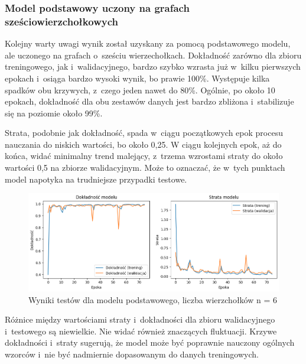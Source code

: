 \subsubsection{Model podstawowy uczony na grafach sześciowierzchołkowych}

Kolejny warty uwagi wynik został uzyskany za pomocą podstawowego modelu, ale uczonego na grafach o~sześciu wierzechołkach.
Dokładność zarówno dla zbioru treningowego, jak i~walidacyjnego, bardzo szybko wzrasta już w~kilku pierwszych epokach
i~osiąga bardzo wysoki wynik, bo prawie 100\%.
Występuje kilka spadków obu krzywych, z~czego jeden nawet do 80\%.
Ogólnie, po około 10 epokach, dokładność dla obu zestawów danych jest bardzo zbliżona i~stabilizuje się na poziomie około 99\%.

Strata, podobnie jak dokładność, spada w~ciągu początkowych epok procesu nauczania do niskich wartości, bo około 0,25.
W ciągu kolejnych epok, aż do końca, widać minimalny trend malejący, z~trzema wzrostami straty do około wartości 0,5 na zbiorze walidacyjnym.
Może to oznaczać, że w~tych punktach model napotyka na trudniejsze przypadki testowe.

\begin{figure}[ht]
	\centering
	\includegraphics[width=15.5cm]{resources/tests/images/v3/base6_img.png}
	\caption{Wyniki testów dla modelu podstawowego, liczba wierzchołków n = 6}
	\label{Fig:tests-base-3a}
\end{figure}
\FloatBarrier

Różnice między wartościami straty i~dokładności dla zbioru walidacyjnego i~testowego są niewielkie.
Nie widać również znaczących fluktuacji.
Krzywe dokładności i~straty sugerują, że model może być poprawnie nauczony ogólnych wzorców
i~nie być nadmiernie dopasowanym do danych treningowych.


